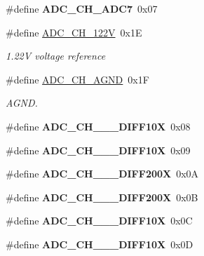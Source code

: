 \begin{CompactItemize}
\item 
\hypertarget{group__a2d_gb9748223968807824cc3d22300f21b8f}{
\#define \textbf{ADC\_\-CH\_\-ADC7}~0x07}
\label{group__a2d_gb9748223968807824cc3d22300f21b8f}

\item 
\hypertarget{group__a2d_g2cd1386de0c0435075581f5f14f50a4a}{
\#define \hyperlink{group__a2d_g2cd1386de0c0435075581f5f14f50a4a}{ADC\_\-CH\_\-122V}~0x1E}
\label{group__a2d_g2cd1386de0c0435075581f5f14f50a4a}

\begin{CompactList}\small\item\em 1.22V voltage reference \item\end{CompactList}\item 
\hypertarget{group__a2d_g0ed7f039502e8a1065f0b4a6157fb753}{
\#define \hyperlink{group__a2d_g0ed7f039502e8a1065f0b4a6157fb753}{ADC\_\-CH\_\-AGND}~0x1F}
\label{group__a2d_g0ed7f039502e8a1065f0b4a6157fb753}

\begin{CompactList}\small\item\em AGND. \item\end{CompactList}\item 
\hypertarget{group__a2d_g1d0b3b606a92ff5d5e328e5ef1979c78}{
\#define \textbf{ADC\_\-CH\_\_\_\-DIFF10X}~0x08}
\label{group__a2d_g1d0b3b606a92ff5d5e328e5ef1979c78}

\item 
\hypertarget{group__a2d_g8b2a5dcae180cd218d02f7a623790ef1}{
\#define \textbf{ADC\_\-CH\_\_\_\-DIFF10X}~0x09}
\label{group__a2d_g8b2a5dcae180cd218d02f7a623790ef1}

\item 
\hypertarget{group__a2d_gb9f0b92dd2b67505c26233ada7205e3b}{
\#define \textbf{ADC\_\-CH\_\_\_\-DIFF200X}~0x0A}
\label{group__a2d_gb9f0b92dd2b67505c26233ada7205e3b}

\item 
\hypertarget{group__a2d_gb31f08e45996680fef63c8e4c9125f5d}{
\#define \textbf{ADC\_\-CH\_\_\_\-DIFF200X}~0x0B}
\label{group__a2d_gb31f08e45996680fef63c8e4c9125f5d}

\item 
\hypertarget{group__a2d_g03b2bd74b75fd0a659a927aad76002de}{
\#define \textbf{ADC\_\-CH\_\_\_\-DIFF10X}~0x0C}
\label{group__a2d_g03b2bd74b75fd0a659a927aad76002de}

\item 
\hypertarget{group__a2d_gf70e34012606f8a3d0e8afd3507c6fcb}{
\#define \textbf{ADC\_\-CH\_\_\_\-DIFF10X}~0x0D}
\label{group__a2d_gf70e34012606f8a3d0e8afd3507c6fcb}


\end{CompactItemize}
